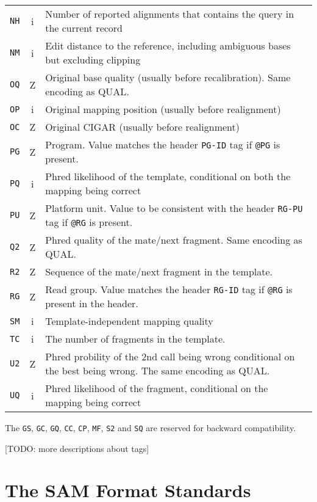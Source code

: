 \documentclass[10pt]{article}
\begin{document}
\begin{center}
\begin{tabular}{ccp{12.5cm}}
  {\tt NH} & i & Number of reported alignments that contains the query in the current record\\
  {\tt NM} & i & Edit distance to the reference, including ambiguous bases but excluding clipping \\
  {\tt OQ} & Z & Original base quality (usually before recalibration). Same encoding as {\sf QUAL}.\\
  {\tt OP} & i & Original mapping position (usually before realignment) \\
  {\tt OC} & Z & Original CIGAR (usually before realignment) \\
  {\tt PG} & Z & Program. Value matches the header {\tt PG-ID} tag if {\tt @PG} is present. \\
  {\tt PQ} & i & Phred likelihood of the template, conditional on both the mapping being correct \\
  {\tt PU} & Z & Platform unit. Value to be consistent with the header {\tt RG-PU} tag if {\tt @RG} is present.\\
  {\tt Q2} & Z & Phred quality of the mate/next fragment. Same encoding as {\sf QUAL}.\\
  {\tt R2} & Z & Sequence of the mate/next fragment in the template. \\
  {\tt RG} & Z & Read group. Value matches the header {\tt RG-ID} tag if {\tt @RG} is present in the header. \\
  {\tt SM} & i & Template-independent mapping quality \\
  {\tt TC} & i & The number of fragments in the template.\\
  {\tt U2} & Z & Phred probility of the 2nd call being wrong conditional on the best being wrong. The same encoding as {\sf QUAL}. \\
  {\tt UQ} & i & Phred likelihood of the fragment, conditional on the mapping being correct \\
  \hline
\end{tabular}
\end{center}
The {\tt GS}, {\tt GC}, {\tt GQ}, {\tt CC}, {\tt CP}, {\tt MF}, {\tt S2}
and {\tt SQ} are reserved for backward compatibility.

[TODO: more descriptions about tags]

\pagebreak

\section{The SAM Format Standards}
\end{document}
